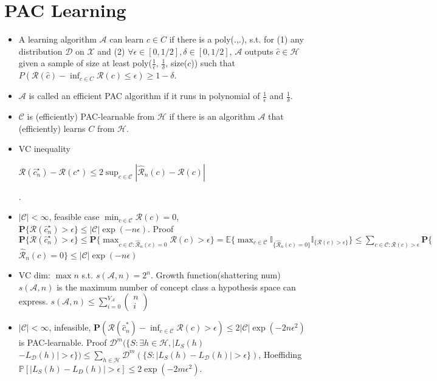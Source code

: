 \section{PAC Learning}

\begin{itemize}[itemsep=0pt,topsep=0pt, leftmargin=2pt, itemindent=5pt, labelwidth=5pt]
    \item A learning algorithm $\mathcal{A}$ can learn $c\in C$ if there is a poly(.,.), s.t. for (1) any distribution $\mathcal{D}$ on $\mathcal{X}$ and (2) $\forall \epsilon\in [0, 1/2],\delta\in [0, 1/2]$, $\mathcal{A}$ outputs $\hat{c}\in \mathcal{H}$ given a sample of size at least poly($\frac{1}{\epsilon}$, $\frac{1}{\delta}$, size($c$)) such that $P(\mathcal{R}(\hat{c})-\inf_{c\in C}\mathcal{R}(c)\le\epsilon) \ge 1-\delta$.
    \item $\mathcal{A}$ is called an efficient PAC algorithm if it runs in polynomial of $\frac{1}{\epsilon}$ and $\frac{1}{\delta}$.
    \item $\mathcal{C}$ is (efficiently) PAC-learnable from $\mathcal{H}$ if there is an algorithm $\mathcal{A}$ that (efficiently) learns $C$ from $\mathcal{H}$.
    \item VC inequality\begin{scriptsize}$\mathcal{R}(\hat{c}_{n}^{\star})-\mathcal{R}(c^{\star}) \leq 2 \sup _{c \in \mathcal{C}}|\hat{\mathcal{R}}_{n}(c)-\mathcal{R}(c)|$\end{scriptsize}.
    \item $|\mathcal{C}|<\infty$, feasible case $\min _{c \in \mathcal{C}} \mathcal{R}(c)=0$, $\mathbf{P}\{\mathcal{R}(\hat{c}_{n}^{\star})>\epsilon\} \leq|\mathcal{C}| \exp (-n \epsilon)$. 
        Proof $\mathbf{P}\{\mathcal{R}(\hat{c}_{n}^{\star})>\epsilon\} \leq \mathbf{P}\{\max _{c \in \mathcal{C}: \hat{\mathcal{R}}_{n}(c)=0} \mathcal{R}(c)>\epsilon\} = \mathbb{E}\{\max _{c \in \mathcal{C}} \mathbb{I}_{\{\hat{\mathcal{R}}_{n}(c)=0\}} \mathbb{I}_{\{\mathcal{R}(c)>\epsilon\}}\}\leq \sum_{c \in \mathcal{C}: \mathcal{R}(c)>\epsilon} \mathbf{P}\{$\\$\hat{\mathcal{R}}_{n}(c)=0\} \leq|\mathcal{C}| \exp (-n \epsilon)$

    \item VC dim: $\max n$ s.t. $s(\mathcal{A}, n)=2^{n}$. Growth function(shattering num) $s(\mathcal{A}, n)$ is the maximum number of concept class a hypothesis space can express. $s(\mathcal{A}, n) \leq \sum_{i=0}^{V_{\mathcal{A}}}(\begin{array}{l}n \\i\end{array})$
    \item $|\mathcal{C}|<\infty$, infeasible, $\mathbf{P}(\mathcal{R}(\hat{c}_{n}^{*})-\inf _{c \in \mathcal{C}} \mathcal{R}(c)>\epsilon) \leq 2|\mathcal{C}| \exp (-2{n \epsilon^{2}})$  is PAC-learnable.
          Proof $\mathcal{D}^{m}(\{S: \exists h \in \mathcal{H},|L_{S}(h)$ $-L_{\mathcal{D}}(h)|>\epsilon\})\leq \sum_{h \in \mathcal{H}} \mathcal{D}^{m}(\{S:|L_{S}(h)-L_{\mathcal{D}}(h)|>\epsilon\})$, Hoeffiding $\mathbb{P}[|L_{S}(h)-L_{D}(h)|>\epsilon] \leq 2 \exp (-2 m \epsilon^{2})$.


\end{itemize}
